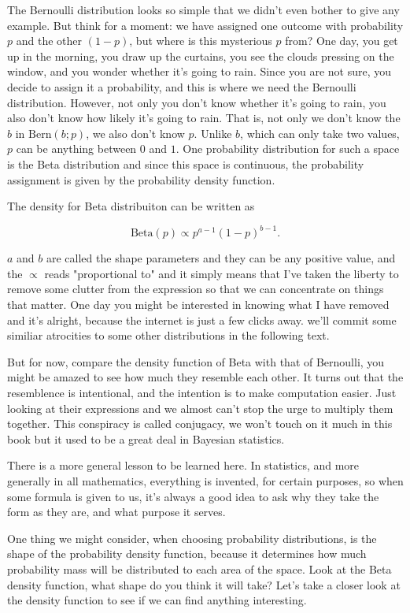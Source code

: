 \documentclass[11pt]{article}
\begin{document}
The Bernoulli distribution looks so simple that we didn't even bother to give any example. But think for a moment: we have assigned one outcome with probability \(p\) and the other \((1-p)\), but where is this mysterious \(p\) from? One day, you get up in the morning, you draw up the curtains, you see the clouds pressing on the window, and you wonder whether it's going to rain. Since you are not sure, you decide to assign it a probability, and this is where we need the Bernoulli distribution. However, not only you don't know whether it's going to rain, you also don't know how likely it's going to rain. That is, not only we don't know the \(b\) in \(\text{Bern}(b; p)\), we also don't know \(p\). Unlike \(b\), which can only take two values, \(p\) can be anything between \(0\) and \(1\). One probability distribution for such a space is the Beta distribution and since this space is continuous, the probability assignment is given by the probability density function.

The density for Beta distribuiton can be written as

$$\text{Beta}(p) \propto p^{a-1} (1-p)^{b-1}. $$

\(a\) and \(b\) are called the shape parameters and they can be any positive value, and the \(\propto\) reads "proportional to" and it simply means that I've taken the liberty to remove some clutter from the expression so that we can concentrate on things that matter. One day you might be interested in knowing what I have removed and it's alright, because the internet is just a few clicks away. we'll commit some similiar atrocities to some other distributions in the following text.

But for now, compare the density function of Beta with that of Bernoulli, you might be amazed to see how much they resemble each other. It turns out that the resemblence is intentional, and the intention is to make computation easier. Just looking at their expressions and we almost can't stop the urge to multiply them together. This conspiracy is called conjugacy, we won't touch on it much in this book but it used to be a great deal in Bayesian statistics.

There is a more general lesson to be learned here. In statistics, and more generally in all mathematics, everything is invented, for certain purposes, so when some formula is given to us, it's always a good idea to ask why they take the form as they are, and what purpose it serves.

One thing we might consider, when choosing probability distributions, is the shape of the probability density function, because it determines how much probability mass will be distributed to each area of the space. Look at the Beta density function, what shape do you think it will take? Let's take a closer look at the density function to see if we can find anything interesting.
\end{document}
